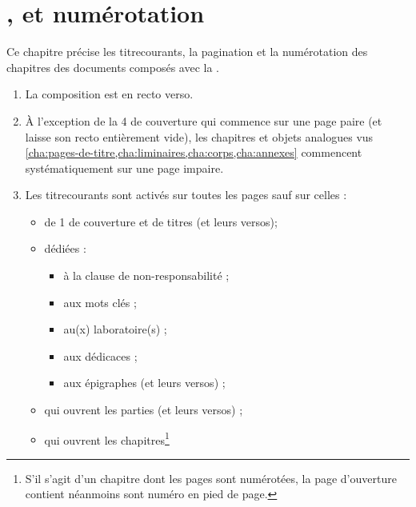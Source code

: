 \chapter{\texorpdfstring{}{Titres courants},  et numérotation}\label{cha:pagination}

Ce chapitre précise les \glspl{titrecourant}, la \gls{pagination} et la
numérotation des chapitres des documents composés avec la \yatcl{}.

\begin{enumerate}
\item La composition est en recto verso\exceptoneside.
\item À l'exception de la 4\ieme{} de couverture qui commence sur une page
  paire (et laisse son recto entièrement vide), les chapitres et objets
  analogues vus \vref{cha:pages-de-titre,cha:liminaires,cha:corps,cha:annexes}
  commencent systématiquement sur une page impaire\exceptoneside.
\item Les \glspl{titrecourant} sont activés sur toutes les pages sauf sur
  celles :
  \begin{itemize}
  \item de 1\iere{} de couverture et de titres (et leurs versos);
  \item dédiées :
    \begin{itemize}
    \item à la clause de non-responsabilité ;
    \item aux mots clés ;
    \item au(x) laboratoire(s) ;
    \item aux dédicaces ;
    \item aux épigraphes (et leurs versos) ;
    \end{itemize}
  \item qui ouvrent les parties (et leurs versos) ;
  \item qui ouvrent les chapitres\footnote{%
      S'il s'agit d'un chapitre dont les pages sont numérotées, la page
      d'ouverture contient néanmoins sont numéro en pied de page.%
}
\end{itemize}
\end{enumerate}
